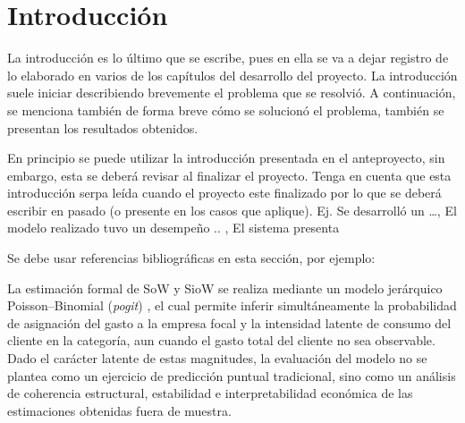 \chapter*{Introducción}

     
La introducción es lo último que se escribe, pues en ella se va a dejar registro de lo elaborado en varios de los capítulos del desarrollo del proyecto. La introducción suele iniciar describiendo brevemente el problema que se resolvió. A continuación, se menciona también de forma breve cómo se solucionó el problema, también se presentan los resultados obtenidos.  

En principio se puede utilizar la introducción presentada en el anteproyecto, sin embargo, esta se deberá revisar al finalizar el proyecto. Tenga en cuenta que esta introducción serpa leída cuando el proyecto este finalizado por lo que se deberá escribir en pasado (o presente en los casos que aplique). Ej. Se desarrolló un …, El modelo realizado tuvo un desempeño .. , El sistema presenta


Se debe usar referencias bibliográficas en esta sección, por ejemplo:

La estimación formal de SoW y SioW se realiza mediante un modelo jerárquico Poisson--Binomial (\emph{pogit})\cite{glady2009predicting}
, el cual permite inferir simultáneamente la probabilidad de asignación del gasto a la empresa focal y la intensidad latente de consumo del cliente en la categoría, aun cuando el gasto total del cliente no sea observable. Dado el carácter latente de estas magnitudes, la evaluación del modelo no se plantea como un ejercicio de predicción puntual tradicional, sino como un análisis de coherencia estructural, estabilidad e interpretabilidad económica de las estimaciones obtenidas fuera de muestra.

